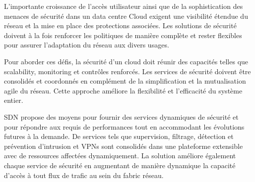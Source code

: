 L'importante croissance de l'accès utilisateur ainsi que de la sophistication des menaces de sécurité dans un data centre Cloud exigent une visibilité étendue du réseau et la mise en place des protections associées. Les solutions de sécurité doivent à la fois renforcer les politiques de manière complète et rester flexibles pour assurer l'adaptation du réseau aux divers usages.


Pour aborder ces défis, la sécurité d'un cloud doit réunir des capacités telles que \gls{scalability}, monitoring et contrôles renforcés. Les services de sécurité doivent être consolidés et coordonnés en complément de la simplification et la mutualisation agile du réseau. Cette approche améliore la flexibilité et l'efficacité du système entier.

SDN propose des moyens pour fournir des services dynamiques de sécurité et pour répondre aux requis de performances tout en accommodant les évolutions futures à la demande. De services tels que supervision, filtrage, détection et prévention d'intrusion et VPNs sont consolidés dans une plateforme extensible avec de ressources affectées dynamiquement. La solution améliore également chaque service de sécurité en augmentant de manière dynamique la capacité d'accès à tout flux de trafic au sein du \gls{fabric} réseau.

